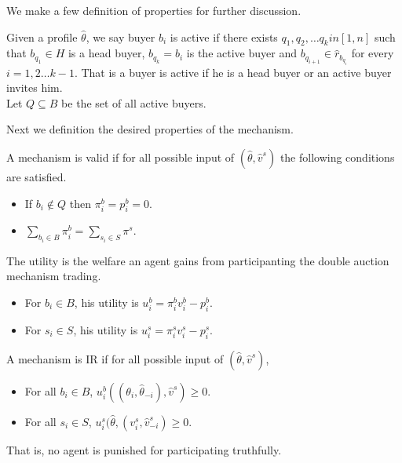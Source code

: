We make a few definition of properties for further discussion.

\begin{definition}
	Given a profile $\hat\theta$, we say buyer $b_i$ is active
	if there exists $q_1,q_2,\ldots q_k in [1,n]$ such that
	$b_{q_1}\in H$ is a head buyer, $b_{q_k}=b_i$ is the active buyer and
	$b_{q_{i+1}} \in \hat r_{b_{q_i}}$ for every $i=1,2\ldots k-1$.
	That is a buyer is active if he is a head buyer or an active buyer invites him.\\
	Let $Q\subseteq B$ be the set of all active buyers.
\end{definition}

Next we definition the desired properties of the mechanism.

\begin{definition}[valid]
	A mechanism is valid if for all possible input of $(\hat\theta,\hat v^s)$ the following conditions are satisfied.
	\begin{itemize}
		\item If $b_i\not\in Q$ then $\pi^b_i=p^b_i=0$.
		\item $\sum_{b_i\in B} \pi^b_i = \sum_{s_i\in S} \pi^s$.
	\end{itemize}
\end{definition} 

\begin{definition}[utility]
	The utility is the welfare an agent gains from participanting the double auction mechanism trading.
	\begin{itemize}
		\item For $b_i\in B$, his utility is $u^b_i = \pi^b_i v^b_i-p^b_i$.
		\item For $s_i\in S$, his utility is $u^s_i = \pi^s_i v^s_i-p^s_i$.
	\end{itemize}
\end{definition}

\begin{definition}
	A mechanism is IR if for all possible input of $(\hat\theta,\hat v^s)$,
	\begin{itemize}
		\item For all $b_i\in B$, $u^b_i((\theta_i,\hat\theta_{-i}),\hat v^s)\geq 0$.
		\item For all $s_i\in S$, $u^s_i(\hat\theta,(v^s_i, \hat v^s_{-i})\geq 0$.
	\end{itemize}
	That is, no agent is punished for participating truthfully.
\end{definition}


